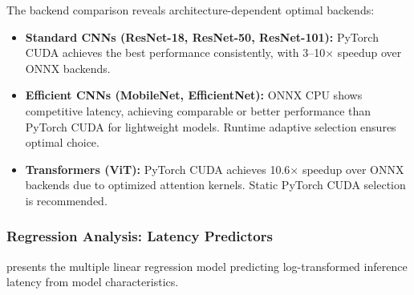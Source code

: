 \documentclass[10pt,twocolumn,a4paper]{article}
\theoremstyle{definition}
\theoremstyle{plain}
\newcommand{\timesX}[1]{#1$\times$}
\begin{document}
The backend comparison reveals architecture-dependent optimal backends:
\begin{itemize}
    \item \textbf{Standard CNNs (ResNet-18, ResNet-50, ResNet-101):} PyTorch CUDA achieves the best performance consistently, with \timesX{3--10} speedup over ONNX backends.
    
    \item \textbf{Efficient CNNs (MobileNet, EfficientNet):} ONNX CPU shows competitive latency, achieving comparable or better performance than PyTorch CUDA for lightweight models. Runtime adaptive selection ensures optimal choice.
    
    \item \textbf{Transformers (ViT):} PyTorch CUDA achieves \timesX{10.6} speedup over ONNX backends due to optimized attention kernels. Static PyTorch CUDA selection is recommended.
\end{itemize}

\subsubsection{Regression Analysis: Latency Predictors}

 presents the multiple linear regression model predicting log-transformed inference latency from model characteristics.
\end{document}
